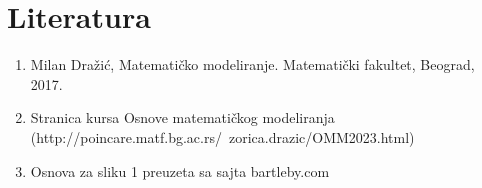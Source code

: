 \documentclass{article}
\begin{document}
\section{\huge Literatura}\label{sec:literatura}
\begin{enumerate}
  \setcounter{enumi}{0}
  \renewcommand{\labelenumi}{[\arabic{enumi}]}
  \item Milan Dražić, Matematičko modeliranje. Matematički fakultet, Beograd,
2017.
  \item Stranica kursa Osnove matematičkog modeliranja (http://poincare.matf.bg.ac.rs/~zorica.drazic/OMM2023.html)
  \item Osnova za sliku 1 preuzeta sa sajta bartleby.com
\end{enumerate}
\end{document}
